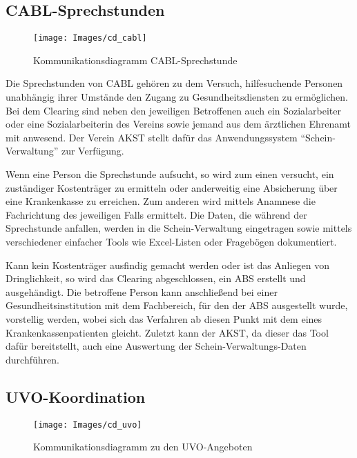 \subsection{CABL-Sprechstunden}\label{sub:cabl}

\begin{figure}[h]
	\centering
	\texttt{[image: Images/cd\_cabl]}
	\caption[Kommunikationsdiagramm CABL-Sprechstunde]{Kommunikationsdiagramm CABL-Sprechstunde}
	\label{fig:cdCABL}
\end{figure}

Die Sprechstunden von \ac{CABL} gehören zu dem Versuch, hilfesuchende Personen unabhängig ihrer Umstände den Zugang zu Gesundheitsdiensten zu ermöglichen. Bei dem Clearing sind neben den jeweiligen Betroffenen auch ein Sozialarbeiter oder eine Sozialarbeiterin des Vereins sowie jemand aus dem ärztlichen Ehrenamt mit anwesend. Der Verein \ac{AKST} stellt dafür das Anwendungssystem \enquote{Schein-Verwaltung} zur Verfügung.

Wenn eine Person die Sprechstunde aufsucht, so wird zum einen versucht, ein zuständiger Kostenträger zu ermitteln oder anderweitig eine Absicherung über eine Krankenkasse zu erreichen. Zum anderen wird mittels Anamnese die Fachrichtung des jeweiligen Falls ermittelt. Die Daten, die während der Sprechstunde anfallen, werden in die Schein-Verwaltung eingetragen sowie mittels verschiedener einfacher Tools wie Excel-Listen oder Fragebögen dokumentiert.

Kann kein Kostenträger ausfindig gemacht werden oder ist das Anliegen von Dringlichkeit, so wird das Clearing abgeschlossen, ein \ac{ABS} erstellt und ausgehändigt. Die betroffene Person kann anschließend bei einer Gesundheitsinstitution mit dem Fachbereich, für den der \ac{ABS} ausgestellt wurde, vorstellig werden, wobei sich das Verfahren ab diesen Punkt mit dem eines Krankenkassenpatienten gleicht. Zuletzt kann der \ac{AKST}, da dieser das Tool dafür bereitstellt, auch eine Auswertung der Schein-Verwaltungs-Daten durchführen.

\subsection{UVO-Koordination}\label{sub:uvo}

\begin{figure}[h]
	\centering
	\texttt{[image: Images/cd\_uvo]}
	\caption[Kommunikationsdiagramm UVO-Angebote]{Kommunikationsdiagramm zu den UVO-Angeboten}
	\label{fig:cdUVO}
\end{figure}

